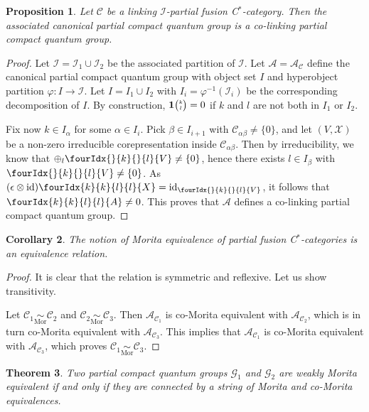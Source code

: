 \documentclass[10pt]{article}
\DeclareMathOperator{\id}{id}
\newcommand{\CatC}{\mathcal{C}}
\newcommand{\CatCC}{\mathscr{C}}
\newcommand{\Grt}[3]{#1{\tiny {\begin{pmatrix} #2\\#3\end{pmatrix}}}}
\newcommand{\UnitC}[2]{\Grt{\mathbf{1}}{#1}{#2}}
\newcommand{\Gr}[5]{\fourIdx{#2}{#4}{#3}{#5}{#1}}%
\newcommand{\Gru}[3]{\Gr{#1}{}{}{#2}{#3}}
\newtheorem{Theorem}{Theorem}[section]
\newtheorem{Prop}[Theorem]{Proposition}
\newtheorem{Cor}[Theorem]{Corollary}
\theoremstyle{definition}
\numberwithin{equation}{section}
\begin{document}
\begin{Prop}\label{PropCoLink} Let $\CatCC$ be a linking $\mathscr{I}$-partial fusion C$^*$-category. Then the associated canonical partial compact quantum group is a co-linking partial compact quantum group. 
\end{Prop} 

\begin{proof} Let $\mathscr{I}= \mathscr{I}_1\cup \mathscr{I}_2$ be the associated partition of $\mathscr{I}$. Let $\mathscr{A} = \mathscr{A}_{\CatCC}$ define the canonical partial compact quantum group with object set $I$ and hyperobject partition $\varphi:I\rightarrow \mathscr{I}$. Let $I=I_1\cup I_2$ with $I_i = \varphi^{-1}(\mathscr{I}_i)$ be the corresponding decomposition of $I$. By construction, $\UnitC{k}{l}=0$ if $k$ and $l$ are not both in $I_1$ or $I_2$. 

Fix now $k\in I_{\alpha}$ for some $\alpha \in I_i$. Pick $\beta\in I_{i+1}$ with $\CatC_{\alpha\beta}\neq\{0\}$, and let $(V,\mathscr{X})$ be a non-zero irreducible corepresentation inside $\CatC_{\alpha\beta}$. Then by irreducibility, we know that $\oplus_l \Gru{V}{k}{l} \neq \{0\}$, hence there exists $l\in I_{\beta}$ with $\Gru{V}{k}{l}\neq \{0\}$. As $(\epsilon\otimes \id)\Gr{X}{k}{l}{k}{l} = \id_{\Gru{V}{k}{l}}$, it follows that $\Gr{A}{k}{l}{k}{l} \neq 0$. This proves that $\mathscr{A}$ defines a co-linking partial compact quantum group.
\end{proof} 

\begin{Cor} The notion of Morita equivalence of partial fusion C$^*$-categories is an equivalence relation.
\end{Cor} 
\begin{proof}  It is clear that the relation is symmetric and reflexive. Let us show transitivity.

Let $\CatCC_1\underset{\textrm{Mor}}{\sim} \CatCC_2$ and $\CatCC_2\underset{\textrm{Mor}}{\sim} \CatCC_3$. Then $\mathscr{A}_{\CatCC_1}$ is co-Morita equivalent with  $\mathscr{A}_{\CatCC_2}$, which is in turn co-Morita equivalent with $\mathscr{A}_{\CatCC_3}$. This implies that $\mathscr{A}_{\CatCC_1}$ is co-Morita equivalent with $\mathscr{A}_{\CatCC_3}$, which proves $\CatCC_1\underset{\textrm{Mor}}{\sim} \CatCC_3$.
\end{proof} 

\begin{Theorem} Two partial compact quantum groups $\mathscr{G}_1$ and $\mathscr{G}_2$ are weakly Morita equivalent if and only if they are connected by a string of Morita and co-Morita equivalences. 
\end{Theorem}
\end{document}
